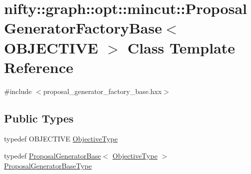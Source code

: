 \hypertarget{classnifty_1_1graph_1_1opt_1_1mincut_1_1ProposalGeneratorFactoryBase}{}\section{nifty\+:\+:graph\+:\+:opt\+:\+:mincut\+:\+:Proposal\+Generator\+Factory\+Base$<$ O\+B\+J\+E\+C\+T\+I\+VE $>$ Class Template Reference}
\label{classnifty_1_1graph_1_1opt_1_1mincut_1_1ProposalGeneratorFactoryBase}


{\ttfamily \#include $<$proposal\+\_\+generator\+\_\+factory\+\_\+base.\+hxx$>$}

\subsection*{Public Types}
\begin{DoxyCompactItemize}
\item 
typedef O\+B\+J\+E\+C\+T\+I\+VE \hyperlink{classnifty_1_1graph_1_1opt_1_1mincut_1_1ProposalGeneratorFactoryBase_a51fcc2cc6c0db5a4d48609e0f9716f1b}{Objective\+Type}
\item 
typedef \hyperlink{classnifty_1_1graph_1_1opt_1_1mincut_1_1ProposalGeneratorBase}{Proposal\+Generator\+Base}$<$ \hyperlink{classnifty_1_1graph_1_1opt_1_1mincut_1_1ProposalGeneratorFactoryBase_a51fcc2cc6c0db5a4d48609e0f9716f1b}{Objective\+Type} $>$ \hyperlink{classnifty_1_1graph_1_1opt_1_1mincut_1_1ProposalGeneratorFactoryBase_a6c03cbefa18b1f47e337d700d774cd97}{Proposal\+Generator\+Base\+Type}
\end{DoxyCompactItemize}
